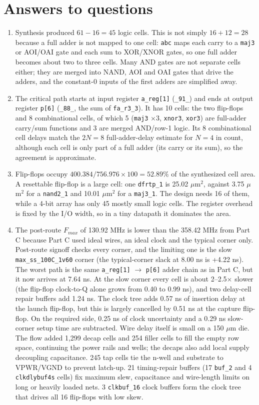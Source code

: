 \documentclass[10pt,a4paper]{article}
\newcommand{\code}[1]{\texttt{#1}}
\begin{document}
\clearpage
\section{Answers to questions}
\begin{enumerate}[leftmargin=*,label=\textbf{\arabic*.}]
\item Synthesis produced $61-16=45$ logic cells. This is not simply $16+12=28$ because a full adder is not mapped to one cell: \code{abc} maps each carry to a \code{maj3} or AOI/OAI gate and each sum to XOR/XNOR gates, so one full adder becomes about two to three cells. Many AND gates are not separate cells either; they are merged into NAND, AOI and OAI gates that drive the adders, and the constant-0 inputs of the first adders are simplified away.
\item The critical path starts at input register \code{a\_reg[1]} (\code{\_91\_}) and ends at output register \code{p[6]} (\code{\_88\_}, the sum of \code{fa\_r3\_3}). It has 10 cells: the two flip-flops and 8 combinational cells, of which 5 (\code{maj3} $\times3$, \code{xnor3}, \code{xor3}) are full-adder carry/sum functions and 3 are merged AND/row-1 logic. Its 8 combinational cell delays match the $2N=8$ full-adder-delay estimate for $N=4$ in count, although each cell is only part of a full adder (its carry or its sum), so the agreement is approximate.
\item Flip-flops occupy $400.384/756.976\times100=52.89\%$ of the synthesized cell area. A resettable flip-flop is a large cell: one \code{dfrtp\_1} is 25.02 $\mu$m$^2$, against 3.75 $\mu$m$^2$ for a \code{nand2\_1} and 10.01 $\mu$m$^2$ for a \code{maj3\_1}. The design needs 16 of them, while a 4-bit array has only 45 mostly small logic cells. The register overhead is fixed by the I/O width, so in a tiny datapath it dominates the area.
\item The post-route $F_{max}$ of 130.92 MHz is lower than the 358.42 MHz from Part C because Part C used ideal wires, an ideal clock and the typical corner only. Post-route signoff checks every corner, and the limiting one is the slow \code{max\_ss\_100C\_1v60} corner (the typical-corner slack at 8.00 ns is +4.22 ns). The worst path is the same \code{a\_reg[1]} $\rightarrow$ \code{p[6]} adder chain as in Part C, but it now arrives at 7.64 ns. At the slow corner every cell is about 2--2.5$\times$ slower (the flip-flop clock-to-Q alone grows from 0.40 to 0.99 ns), and two delay-cell repair buffers add 1.24 ns. The clock tree adds 0.57 ns of insertion delay at the launch flip-flop, but this is largely cancelled by 0.51 ns at the capture flip-flop. On the required side, 0.25 ns of clock uncertainty and a 0.29 ns slow-corner setup time are subtracted. Wire delay itself is small on a 150 $\mu$m die. The flow added 1,299 decap cells and 254 filler cells to fill the empty row space, continuing the power rails and wells; the decaps also add local supply decoupling capacitance. 245 tap cells tie the n-well and substrate to VPWR/VGND to prevent latch-up. 21 timing-repair buffers (17 \code{buf\_2} and 4 \code{clkdlybuf4s} cells) fix maximum slew, capacitance and wire-length limits on long or heavily loaded nets. 3 \code{clkbuf\_16} clock buffers form the clock tree that drives all 16 flip-flops with low skew.

\end{enumerate}
\end{document}
